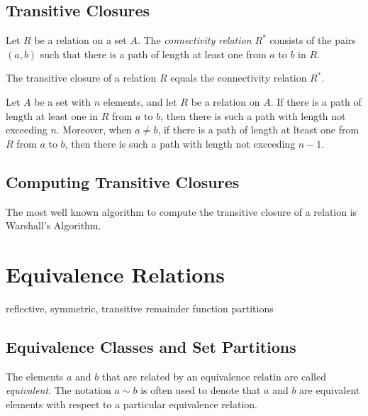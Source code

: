   \subsection{Transitive Closures}

\begin{definition}
Let $R$ be a relation on a set $A$. The \textit{connectivity relation $R^*$} consists of the pairs $(a,b)$ such that there is a path of length at least one from $a$ to $b$ in $R$.
\end{definition}

\begin{theorem}
The transitive closure of a relation $R$ equals the connectivity relation $R^*$.
\end{theorem}

\begin{lemma}
Let $A$ be a set with $n$ elements, and let $R$ be a relation on $A$. If there is a path of length at least one in $R$ from $a$ to $b$, then there is such a path with length not exceeding $n$. Moreover, when $a \ne b$, if there is a path of length at lteast one from $R$ from $a$ to $b$, then there is such a path with length not exceeding $n-1$.
\end{lemma}

  \subsection{Computing Transitive Closures} 
  The most well known algorithm to compute the transitive closure of a relation is Warshall's Algorithm.

 
\section {Equivalence Relations}
reflective, symmetric, transitive
remainder function partitions

    \subsection {Equivalence Classes and Set Partitions}

\begin{definition}
The elements $a$ and $b$ that are related by an equivalence relatin are called \textit{equivalent}. The notation $a \sim b$ is often used to denote that $a$ and $b$ are equivalent elements with respect to a particular equivalence relation.
\end{definition}

